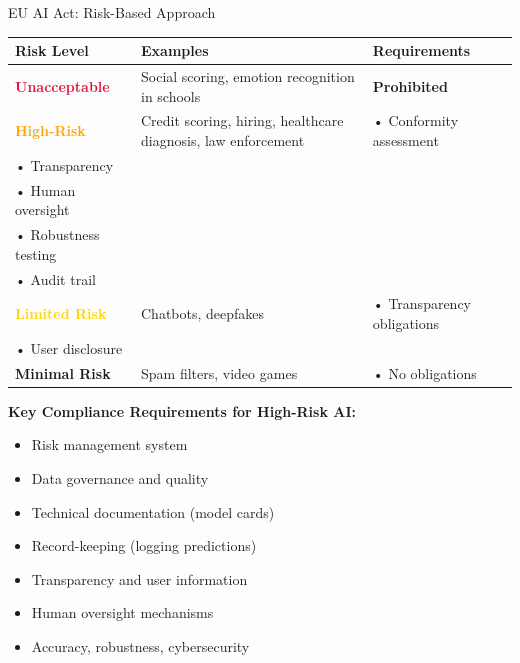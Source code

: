 \begin{frame}{EU AI Act: Risk-Based Approach}
\begin{table}
\centering
\small
\begin{tabular}{p{2.2cm}p{3.5cm}p{4.8cm}}
\toprule
\textbf{Risk Level} & \textbf{Examples} & \textbf{Requirements} \\
\midrule
\textcolor{crimson}{\textbf{Unacceptable}} & Social scoring, emotion recognition in schools & \textbf{Prohibited} \\
\midrule
\textcolor{orange}{\textbf{High-Risk}} & Credit scoring, hiring, healthcare diagnosis, law enforcement & • Conformity assessment\\
• Transparency\\
• Human oversight\\
• Robustness testing\\
• Audit trail \\
\midrule
\textcolor{gold}{\textbf{Limited Risk}} & Chatbots, deepfakes & • Transparency obligations\\
• User disclosure \\
\midrule
\textcolor{forest}{\textbf{Minimal Risk}} & Spam filters, video games & • No obligations \\
\bottomrule
\end{tabular}
\end{table}

\vspace{0.2cm}
\textbf{Key Compliance Requirements for High-Risk AI:}
\begin{itemize}
\item Risk management system
\item Data governance and quality
\item Technical documentation (model cards)
\item Record-keeping (logging predictions)
\item Transparency and user information
\item Human oversight mechanisms
\item Accuracy, robustness, cybersecurity
\end{itemize}
\end{frame}

